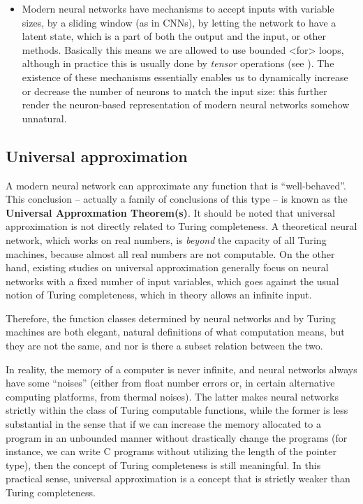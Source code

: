 \documentclass[hyperref, a4paper, 12pt]{report}
\newcommand*{\concept}[1]{{\textbf{#1}}}
\def\texttt#1{<#1>}%
\newcommand{\shortcode}[1]{\texttt{#1}}
\begin{document}
\begin{itemize}
    \item Modern neural networks have mechanisms to accept inputs with variable sizes,
    by a sliding window (as in CNNs), by letting the network to have a latent state,
    which is a part of both the output and the input, or other methods.
    Basically this means we are allowed to use bounded \shortcode{for} loops,
    although in practice this is usually done by \emph{tensor} operations (see ).
    The existence of these mechanisms essentially enables us to dynamically increase or decrease the number of neurons to match the input size:
    this further render the neuron-based representation of modern neural networks somehow unnatural.
\end{itemize}

\subsection{Universal approximation}

A modern neural network can approximate any function that is ``well-behaved''.
This conclusion -- actually a family of conclusions of this type --
is known as the \concept{Universal Approxmation Theorem(s)}.
It should be noted that universal approximation is not directly related to Turing completeness.
A theoretical neural network, which works on real numbers,
is \emph{beyond} the capacity of all Turing machines,
because almost all real numbers are not computable.
On the other hand, existing studies on universal approximation generally focus on
neural networks with a fixed number of input variables,
which goes against the usual notion of Turing completeness,
which in theory allows an infinite input.

Therefore, the function classes determined by neural networks and by Turing machines
are both elegant, natural definitions of what computation means,
but they are not the same, and nor is there a subset relation between the two.

In reality, the memory of a computer is never infinite,
and neural networks always have some ``noises'' (either from float number errors or, in certain alternative computing platforms, from thermal noises).
The latter makes neural networks strictly within the class of Turing computable functions,
while the former is less substantial in the sense that
if we can increase the memory allocated to a program in an unbounded manner 
without drastically change the programs 
(for instance, we can write C programs without utilizing the length of the pointer type),
then the concept of Turing completeness is still meaningful.
In this practical sense, universal approximation is a concept that is strictly weaker than Turing completeness.
\end{document}
